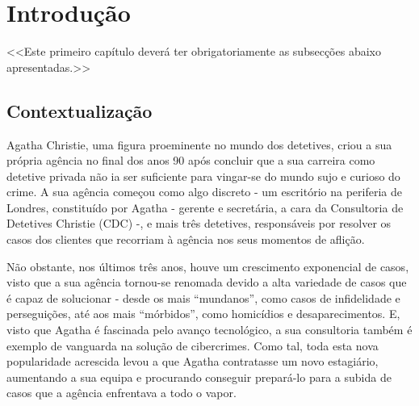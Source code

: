 \documentclass[a4paper,12pt]{scrreprt}
\begin{document}
\pagebreak



\renewcommand{\contentsname}{Índice}

\tableofcontents

\pagebreak

\listoffigures

\pagebreak

\listoftables

\pagebreak





\chapter{Introdução}
    <<Este primeiro capítulo deverá ter obrigatoriamente as subsecções abaixo apresentadas.>>
    \section{Contextualização}
    \par
    Agatha Christie, uma figura proeminente no mundo dos detetives, criou a sua própria agência
    no final dos anos 90 após concluir que a sua carreira como detetive privada não ia ser
    suficiente para vingar-se do mundo sujo e curioso do crime.
    A sua agência começou como algo discreto - um escritório na periferia de Londres, constituído
    por Agatha - gerente e secretária, a cara da Consultoria de Detetives Christie (CDC) -, e mais
    três detetives, responsáveis por resolver os casos dos clientes que recorriam à agência nos
    seus momentos de aflição.
    \par
    Não obstante, nos últimos três anos, houve um crescimento exponencial de casos, visto que a
    sua agência tornou-se renomada devido a alta variedade de casos que é capaz de solucionar -
    desde os mais “mundanos”, como casos de infidelidade e perseguições, até aos mais
    “mórbidos”, como homicídios e desaparecimentos. E, visto que Agatha é fascinada pelo avanço
    tecnológico, a sua consultoria também é exemplo de vanguarda na solução de cibercrimes.
    Como tal, toda esta nova popularidade acrescida levou a que Agatha contratasse um novo
    estagiário, aumentando a sua equipa e procurando conseguir prepará-lo para a subida de
    casos que a agência enfrentava a todo o vapor.
\end{document}
